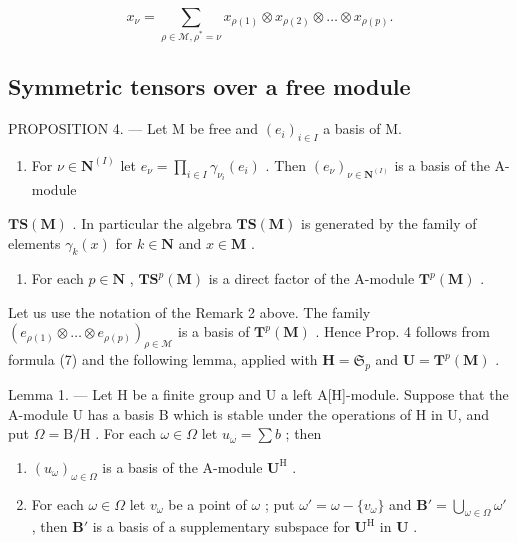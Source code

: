 \[
x _ {\nu} = \sum_ {\rho \in \mathcal {M}, \rho^ {*} = \nu} x _ {\rho (1)} \otimes x _ {\rho (2)} \otimes \dots \otimes x _ {\rho (p)}.\tag{7}
\]

\subsection{Symmetric tensors over a free module}

PROPOSITION 4. --- Let M be free and \((e_{i})_{i\in I}\) a basis of M.

\begin{enumerate}
\def\labelenumi{(\roman{enumi})}
\tightlist
\item
  For \(\nu \in \mathbf{N}^{(I)}\) let \(e_{\nu} = \prod_{i\in I}\gamma_{\nu_i}(e_i)\) . Then \((e_{\nu})_{\nu \in \mathbf{N}^{(I)}}\) is a basis of the A-module
\end{enumerate}

\(\mathbf{TS}(\mathbf{M})\) . In particular the algebra \(\mathbf{TS}(\mathbf{M})\) is generated by the family of elements \(\gamma_k(x)\) for \(k \in \mathbf{N}\) and \(x \in \mathbf{M}\) .

\begin{enumerate}
\def\labelenumi{(\roman{enumi})}
\setcounter{enumi}{1}
\tightlist
\item
  For each \(p \in \mathbf{N}\) , \(\mathbf{T}\mathbf{S}^p(\mathbf{M})\) is a direct factor of the A-module \(\mathbf{T}^p(\mathbf{M})\) .
\end{enumerate}

Let us use the notation of the Remark 2 above. The family \((e_{\rho(1)} \otimes \ldots \otimes e_{\rho(p)})_{\rho \in \mathcal{M}}\) is a basis of \(\mathbf{T}^p(\mathbf{M})\) . Hence Prop. 4 follows from formula (7) and the following lemma, applied with \(\mathbf{H} = \mathfrak{S}_p\) and \(\mathbf{U} = \mathbf{T}^p(\mathbf{M})\) .

Lemma 1. --- Let H be a finite group and U a left A{[}H{]}-module. Suppose that the A-module U has a basis B which is stable under the operations of H in U, and put \(\Omega = \mathrm{B} / \mathrm{H}\) . For each \(\omega \in \Omega\) let \(u_{\omega} = \sum b\) ; then

\begin{enumerate}
\def\labelenumi{(\roman{enumi})}
\item
  \((u_{\omega})_{\omega \in \Omega}\) is a basis of the A-module \(\mathbf{U}^{\mathrm{H}}\) .
\item
  For each \(\omega \in \Omega\) let \(v_{\omega}\) be a point of \(\omega\) ; put \(\omega' = \omega - \{v_{\omega}\}\) and \(\mathbf{B}' = \bigcup_{\omega \in \Omega} \omega'\) , then \(\mathbf{B}'\) is a basis of a supplementary subspace for \(\mathbf{U}^{\mathrm{H}}\) in \(\mathbf{U}\) .
\end{enumerate}

